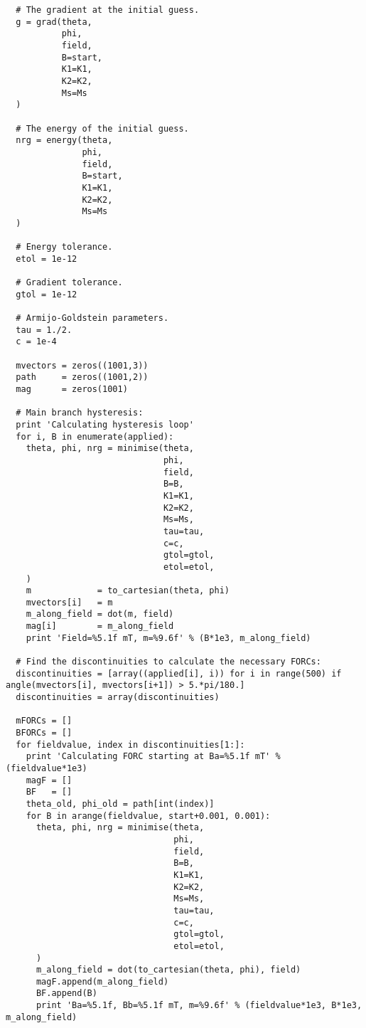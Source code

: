 \begin{lstlisting}
  # The gradient at the initial guess.
  g = grad(theta,
           phi,
           field,
           B=start,
           K1=K1,
           K2=K2,
           Ms=Ms
  )

  # The energy of the initial guess.
  nrg = energy(theta,
               phi,
               field,
               B=start,
               K1=K1,
               K2=K2,
               Ms=Ms
  )

  # Energy tolerance.
  etol = 1e-12

  # Gradient tolerance.
  gtol = 1e-12

  # Armijo-Goldstein parameters.
  tau = 1./2.
  c = 1e-4

  mvectors = zeros((1001,3))
  path     = zeros((1001,2))
  mag      = zeros(1001)

  # Main branch hysteresis:
  print 'Calculating hysteresis loop'
  for i, B in enumerate(applied):
    theta, phi, nrg = minimise(theta,
                               phi,
                               field,
                               B=B,
                               K1=K1,
                               K2=K2,
                               Ms=Ms,
                               tau=tau,
                               c=c,
                               gtol=gtol,
                               etol=etol,
    )
    m             = to_cartesian(theta, phi)
    mvectors[i]   = m
    m_along_field = dot(m, field)
    mag[i]        = m_along_field
    print 'Field=%5.1f mT, m=%9.6f' % (B*1e3, m_along_field)

  # Find the discontinuities to calculate the necessary FORCs:
  discontinuities = [array((applied[i], i)) for i in range(500) if angle(mvectors[i], mvectors[i+1]) > 5.*pi/180.]
  discontinuities = array(discontinuities)

  mFORCs = []
  BFORCs = []
  for fieldvalue, index in discontinuities[1:]:
    print 'Calculating FORC starting at Ba=%5.1f mT' % (fieldvalue*1e3)
    magF = []
    BF   = []
    theta_old, phi_old = path[int(index)]
    for B in arange(fieldvalue, start+0.001, 0.001):
      theta, phi, nrg = minimise(theta,
                                 phi,
                                 field,
                                 B=B,
                                 K1=K1,
                                 K2=K2,
                                 Ms=Ms,
                                 tau=tau,
                                 c=c,
                                 gtol=gtol,
                                 etol=etol,
      )
      m_along_field = dot(to_cartesian(theta, phi), field)
      magF.append(m_along_field)
      BF.append(B)
      print 'Ba=%5.1f, Bb=%5.1f mT, m=%9.6f' % (fieldvalue*1e3, B*1e3, m_along_field)


\end{lstlisting}
